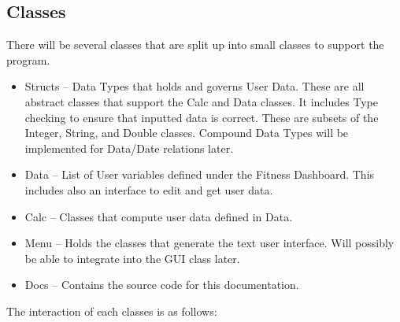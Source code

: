 \documentclass[../Documentation.tex]{subfiles}
\begin{document}
\subsection{Classes}
There will be several classes that are split up into small classes to support the program.
\begin{itemize}
	\item Structs -- Data Types that holds and governs User Data. These are all abstract classes that support the Calc and Data classes. It includes Type checking to ensure that inputted data is correct. These are subsets of the Integer, String, and Double classes. Compound Data Types will be implemented for Data/Date relations later.
	\item Data -- List of User variables defined under the Fitness Dashboard. This includes also an interface to edit and get user data.
	\item Calc -- Classes that compute user data defined in Data.
	\item Menu -- Holds the classes that generate the text user interface. Will possibly be able to integrate into the GUI class later.
	\item Docs -- Contains the source code for this documentation.
\end{itemize}
The interaction of each classes is as follows: \\
\begin{center}
\end{center}
\end{document}
